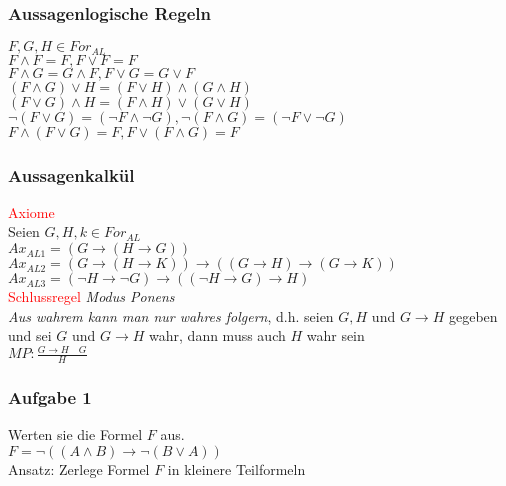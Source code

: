 \documentclass{beamer}
\begin{document}
	\begin{frame}
		\frametitle{Aussagenlogische Regeln}
		$F,G,H\in For_{AL}$\\
		$F\wedge F=F,F\vee F=F$\\
		$F\wedge G=G\wedge F, F\vee G=G\vee F$\\
		$(F\wedge G)\vee H=(F\vee H)\wedge(G\wedge H)$\\
		$(F\vee G)\wedge H=(F\wedge H)\vee(G\vee H)$\\
		$\neg(F\vee G)=(\neg F\wedge\neg G), \neg(F\wedge G)=(\neg F\vee\neg G)$\\
		$F\wedge(F\vee G)=F, F\vee(F\wedge G)=F$\\
	\end{frame}
	\begin{frame}
		\frametitle{Aussagenkalkül}
		\textcolor{red}{Axiome}\\
		Seien $G,H,k\in For_{AL}$\\
		$Ax_{AL1} = (G\rightarrow(H\rightarrow G))$\\
		$Ax_{AL2} = (G\rightarrow(H\rightarrow K))\rightarrow((G\rightarrow H)\rightarrow(G\rightarrow K))$\\
		$Ax_{AL3} = (\neg H\rightarrow\neg G)\rightarrow((\neg H\rightarrow G)\rightarrow H)$\\
		\textcolor{red}{Schlussregel} \emph{Modus Ponens}\\
		\emph{Aus wahrem kann man nur wahres folgern}, d.h. seien $G, H$ und $G\rightarrow H$ gegeben und sei $G$ und $G\rightarrow H$ wahr, dann muss auch $H$ wahr sein\\
		$MP : \frac{G\rightarrow H\quad G}{H}$\\
	\end{frame}
	\begin{frame}
		\frametitle{Aufgabe 1}
		Werten sie die Formel $F$ aus.\\
		$F = \neg((A\wedge B)\rightarrow\neg(B\vee A))$\\
		Ansatz: Zerlege Formel $F$ in kleinere Teilformeln\\
	\end{frame}
\end{document}

